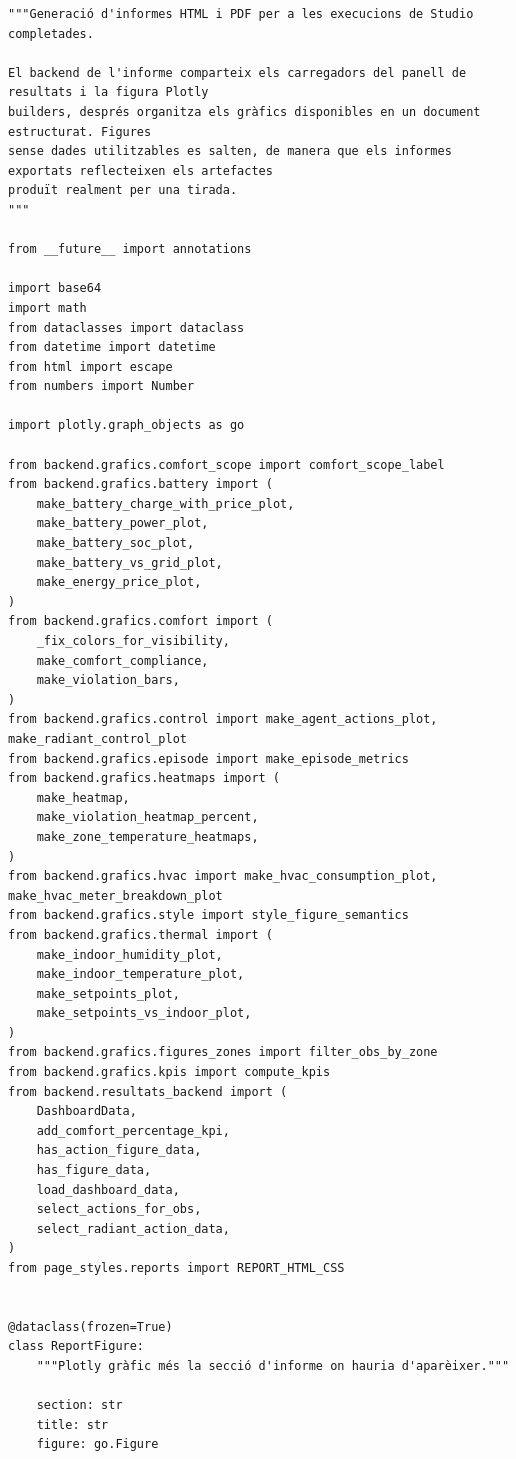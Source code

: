 \documentclass[10pt,a4paper]{article}
\begin{document}
\begin{lstlisting}[style=studioPython,caption={backend/resultats\_report\_backend.py},label={lst:backend-resultats-report-backend-py}]
"""Generació d'informes HTML i PDF per a les execucions de Studio completades.

El backend de l'informe comparteix els carregadors del panell de resultats i la figura Plotly
builders, després organitza els gràfics disponibles en un document estructurat. Figures
sense dades utilitzables es salten, de manera que els informes exportats reflecteixen els artefactes
produït realment per una tirada.
"""

from __future__ import annotations

import base64
import math
from dataclasses import dataclass
from datetime import datetime
from html import escape
from numbers import Number

import plotly.graph_objects as go

from backend.grafics.comfort_scope import comfort_scope_label
from backend.grafics.battery import (
    make_battery_charge_with_price_plot,
    make_battery_power_plot,
    make_battery_soc_plot,
    make_battery_vs_grid_plot,
    make_energy_price_plot,
)
from backend.grafics.comfort import (
    _fix_colors_for_visibility,
    make_comfort_compliance,
    make_violation_bars,
)
from backend.grafics.control import make_agent_actions_plot, make_radiant_control_plot
from backend.grafics.episode import make_episode_metrics
from backend.grafics.heatmaps import (
    make_heatmap,
    make_violation_heatmap_percent,
    make_zone_temperature_heatmaps,
)
from backend.grafics.hvac import make_hvac_consumption_plot, make_hvac_meter_breakdown_plot
from backend.grafics.style import style_figure_semantics
from backend.grafics.thermal import (
    make_indoor_humidity_plot,
    make_indoor_temperature_plot,
    make_setpoints_plot,
    make_setpoints_vs_indoor_plot,
)
from backend.grafics.figures_zones import filter_obs_by_zone
from backend.grafics.kpis import compute_kpis
from backend.resultats_backend import (
    DashboardData,
    add_comfort_percentage_kpi,
    has_action_figure_data,
    has_figure_data,
    load_dashboard_data,
    select_actions_for_obs,
    select_radiant_action_data,
)
from page_styles.reports import REPORT_HTML_CSS


@dataclass(frozen=True)
class ReportFigure:
    """Plotly gràfic més la secció d'informe on hauria d'aparèixer."""

    section: str
    title: str
    figure: go.Figure



\end{lstlisting}
\end{document}
